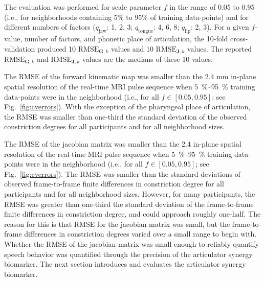 \documentclass[preprint]{JASAnew}
\begin{document}
The evaluation was performed for scale parameter $f$ in the range of \num{0.05} to \num{0.95} (i.e., for neighborhoods containing 5\% to 95\% of training data-points) and for different numbers of factors ($q_\text{jaw}$: \num{1}, \num{2}, \num{3}; $q_\text{tongue}$: \num{4}, \num{6}, \num{8}; $q_\text{lip}$: \num{2}, \num{3}). 
%
For a given $f$-value, number of factors, and phonetic place of articulation, the 10-fold cross-validation produced 10 $\mathrm{RMSE}_{\mathbf{G},k}$ values and 10 $\mathrm{RMSE}_{\mathbf{J},k}$ values.
%
The reported $\mathrm{RMSE}_{\mathbf{G},k}$ and $\mathrm{RMSE}_{\mathbf{J},k}$ values are the medians of these 10 values.



The RMSE of the forward kinematic map was smaller than the 2.4 mm in-plane spatial resolution of the real-time MRI pulse sequence when \SIrange{5}{95}{\percent} training data-points were in the neighborhood (i.e., for all $f\in \left[ 0.05, 0.95\right]$; see Fig.~\ref{fig:cverrors}). With the exception of the pharyngeal place of articulation, the RMSE was smaller than one-third the standard deviation of the observed constriction degrees for all participants and for all neighborhood sizes.


The RMSE of the jacobian matrix was smaller than the 2.4 in-plane spatial resolution of the real-time MRI pulse sequence when \SIrange{5}{95}{\percent} training data-points were in the neighborhood (i.e., for all $f\in \left[ 0.05, 0.95\right]$; see Fig.~\ref{fig:cverrors}).
%
The RMSE was smaller than the standard deviations of observed frame-to-frame finite differences in constriction degree for all participants and for all neighborhood sizes. 
%
However, for many participants, the RMSE was greater than one-third the standard deviation of the frame-to-frame finite differences in constriction degree, and could approach roughly one-half.
%
The reason for this is that RMSE for the jacobian matrix was small, but the frame-to-frame differences in constriction degrees varied over a small range to begin with. 
% 
Whether the RMSE of the jacobian matrix was small enough to reliably quantify speech behavior was quantified through the precision of the articulator synergy biomarker. 
% 
The next section introduces and evaluates the articulator synergy biomarker. 
\end{document}
